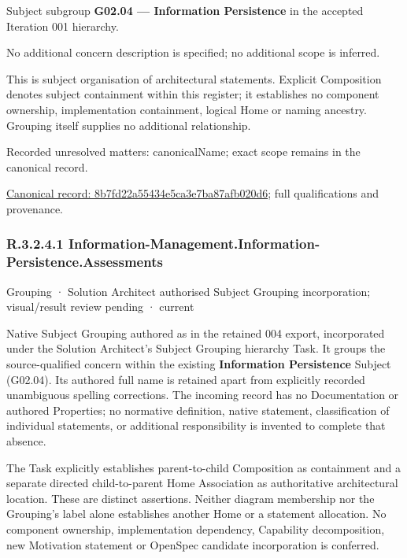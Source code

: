 Subject subgroup \textbf{G02.04 — Information Persistence} in the accepted Iteration 001 hierarchy.



No additional concern description is specified; no additional scope is inferred.



This is subject organisation of architectural statements. Explicit Composition denotes subject containment within this register; it establishes no component ownership, implementation containment, logical Home or naming ancestry. Grouping itself supplies no additional relationship.


{\small Recorded unresolved matters: canonicalName; exact scope remains in the canonical record.}\par
{\footnotesize \href{../../../../continuum/grouping/8b7fd22a55434e5ca3e7ba87afb020d6.md}{Canonical record: 8b7fd22a55434e5ca3e7ba87afb020d6}; full qualifications and provenance.}\par
\subsubsection*{R.3.2.4.1 Information-Management.Information-Persistence.Assessments}
\label{navigation:R.3.2.4.1}

\label{element:d733a698d2c4477db4a4289144417e3f}
{\small Grouping · Solution Architect authorised Subject Grouping incorporation; visual/result review pending · current}\par

Native Subject Grouping authored as \texttt{} in the retained 004 export,
incorporated under the Solution Architect's Subject Grouping hierarchy Task.
It groups the source-qualified \texttt{} concern within
the existing \textbf{Information Persistence} Subject (G02.04). Its authored full name
is retained apart from explicitly recorded unambiguous spelling corrections.
The incoming record has no Documentation or authored Properties; no normative
definition, native statement, classification of individual statements, or
additional responsibility is invented to complete that absence.



The Task explicitly establishes parent-to-child Composition as containment and
a separate directed child-to-parent Home Association as authoritative architectural
location. These are distinct assertions. Neither diagram membership nor the
Grouping's label alone establishes another Home or a statement allocation.
No component ownership, implementation dependency, Capability decomposition,
new Motivation statement or OpenSpec candidate incorporation is conferred.



